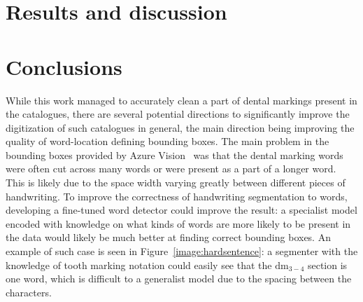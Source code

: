 \documentclass{article}
\begin{document}

\section{Results and discussion}

\section{Conclusions}

While this work managed to accurately clean a part of dental markings present in the catalogues, 
there are several potential directions to significantly improve the digitization of such catalogues in general, the main direction 
being improving the quality of word-location defining bounding boxes. The main problem in the bounding boxes provided 
by Azure Vision~\cite{azurevision} was that the dental marking words were often cut across many words or were present 
as a part of a longer word. This is likely due to the space width varying greatly between different pieces of 
handwriting. To improve the correctness of handwriting segmentation to words, developing a fine-tuned word detector 
could improve the result: a specialist model encoded with knowledge on what kinds of words are more likely to be 
present in the data would likely be much better at finding correct bounding boxes. An example of 
such case is seen in Figure~\ref{image:hardsentence}: a segmenter with the knowledge of tooth marking notation could 
easily see that the $\text{dm}_{3-4}$ section is one word, which is difficult to a generalist model 
due to the spacing between the characters.
\end{document}
